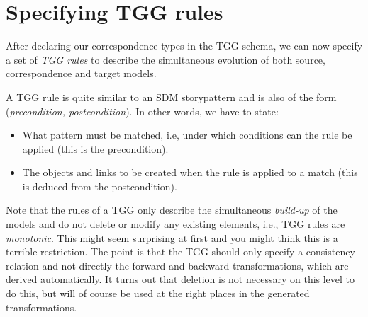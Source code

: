 \newpage
\section{Specifying TGG rules}
\genHeader

After declaring our correspondence types in the TGG schema, we can now specify a set of \emph{TGG rules} to describe the simultaneous evolution of both source,
correspondence and target models.

A TGG rule is quite similar to an SDM storypattern and is also of the form (\emph{precondition, postcondition}). In other words, we have to state:

\begin{itemize}
  \item What pattern must be matched, i.e, under which conditions can the rule be applied (this is the precondition).
  \item The objects and links to be created when the rule is applied to a match (this is deduced from the postcondition).
\end{itemize}

Note that the rules of a TGG only describe the simultaneous \emph{build-up} of the models and do not delete or modify any existing elements, i.e., TGG rules
are \emph{monotonic}. This might seem surprising at first and you might think this is a terrible restriction. The point is that the TGG should only specify a
consistency relation and not directly the forward and backward transformations, which are derived automatically. It turns out that deletion is not necessary on
this level to do this, but will of course be used at the right places in the generated transformations.




